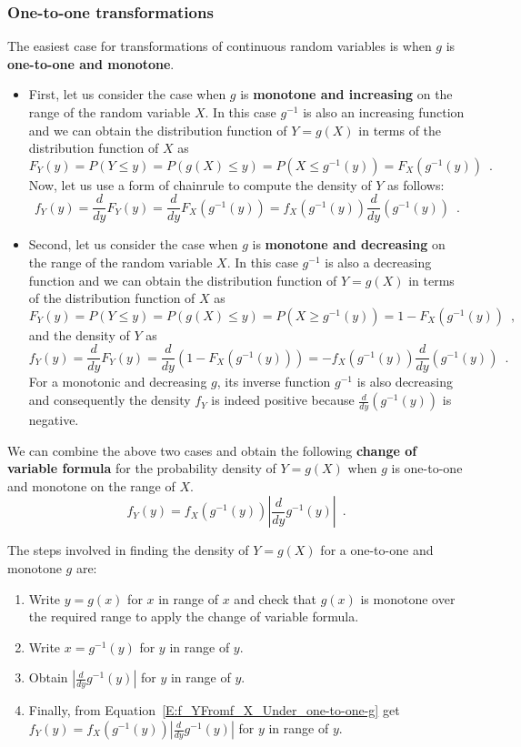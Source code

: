 \subsubsection{One-to-one transformations}\label{S:f_YDirectlyFromf_X}
The easiest case for transformations of continuous random variables is when $g$ is {\bf one-to-one and monotone}.  
\begin{itemize}
\item{
First, let us consider the case when $g$ is {\bf monotone and increasing} on the range of the random variable $X$.  
In this case $g^{-1}$ is also an increasing function and we can obtain the distribution function of $Y=g(X)$ in terms of the distribution function of $X$ as   
\[
F_Y(y) =P \left(Y \leq y \right)=P \left(g(X) \leq y \right) = P \left(X \leq g^{-1}(y) \right) = F_X(g^{-1}(y)) \enspace .
\]
Now, let us use a form of chainrule to compute the density of $Y$ as follows:
\[
f_Y(y) 
= \frac{d}{dy} F_Y(y)
= \frac{d}{dy} F_X \left(g^{-1}(y) \right)
= f_X \left( g^{-1}(y) \right) \frac{d}{dy} \left(g^{-1}(y) \right) \enspace . 
\]
}
\item{
Second, let us consider the case when $g$ is {\bf monotone and decreasing} on the range of the random variable $X$.  
In this case $g^{-1}$ is also a decreasing function and we can obtain the distribution function of $Y=g(X)$ in terms of the distribution function of $X$ as   
\[
F_Y(y) =P \left(Y \leq y \right)=P \left(g(X) \leq y \right) = P \left(X \geq g^{-1}(y) \right) = 1- F_X(g^{-1}(y)) \enspace ,
\]
and the density of $Y$ as 
\[
f_Y(y) 
= \frac{d}{dy} F_Y(y)
= \frac{d}{dy} \left(1-F_X \left(g^{-1}(y) \right) \right)
= -f_X \left( g^{-1}(y) \right) \frac{d}{dy} \left(g^{-1}(y) \right) \enspace . 
\]
For a monotonic and decreasing $g$, its inverse function $g^{-1}$ is also decreasing and consequently the density $f_Y$ is indeed positive because $\frac{d}{dy} \left(g^{-1}(y) \right)$ is negative.  
}
\end{itemize}
We can combine the above two cases and obtain the following 
{\bf change of variable formula} for the probability density of $Y=g(X)$ when $g$ is one-to-one and monotone on the range of $X$.
\begin{equation}\label{E:f_YFromf_X_Under_one-to-one-g}
\boxed{
f_Y(y) = f_X \left( g^{-1}(y) \right) \left\vert \frac{d}{dy} g^{-1}(y) \right\vert \enspace .}
\end{equation}

The steps involved in finding the density of $Y=g(X)$ for a one-to-one and monotone $g$ are:
\begin{enumerate}
\item Write $y=g(x)$ for $x$ in range of $x$ and check that $g(x)$ is monotone over the required range to apply the change of variable formula. 
\item Write $x=g^{-1}(y)$ for $y$ in range of $y$.
\item Obtain $\left\vert \frac{d}{dy} g^{-1}(y) \right\vert$ for $y$ in range of $y$.
\item Finally, from Equation~\eqref{E:f_YFromf_X_Under_one-to-one-g} get $f_Y(y) = f_X \left( g^{-1}(y) \right) \left\vert \frac{d}{dy} g^{-1}(y) \right\vert$ for $y$ in range of $y$. 
\end{enumerate}

